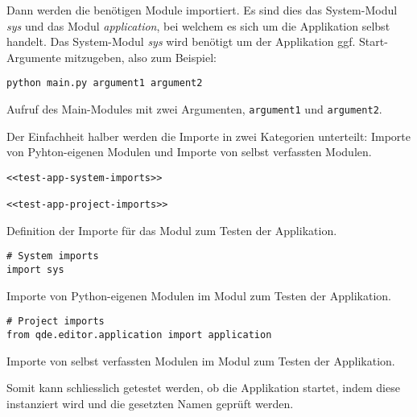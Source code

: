 \documentclass[10pt, openright, notitlepage]{scrreprt}
\begin{document}
Dann werden die benötigen Module importiert. Es sind dies das System-Modul
\emph{sys} und das Modul \emph{application}, bei welchem es sich um die Applikation
selbst handelt. Das System-Modul \emph{sys} wird benötigt um der Applikation ggf.
Start-Argumente mitzugeben, also zum Beispiel:

\begin{listing}[H]
\begin{verbatim}
python main.py argument1 argument2
\end{verbatim}
\caption{\label{orgd1f84d9}
Aufruf des Main-Modules mit zwei Argumenten, \texttt{argument1} und \texttt{argument2}.}
\end{listing}

Der Einfachheit halber werden die Importe in zwei Kategorien unterteilt: Importe
von Pyhton-eigenen Modulen und Importe von selbst verfassten Modulen.

\begin{listing}[H]
\begin{verbatim}
<<test-app-system-imports>>

<<test-app-project-imports>>
\end{verbatim}
\caption{\label{orge011ad2}
Definition der Importe für das Modul zum Testen der Applikation.}
\end{listing}

\begin{listing}[H]
\begin{verbatim}
# System imports
import sys
\end{verbatim}
\caption{\label{org2474af3}
Importe von Python-eigenen Modulen im Modul zum Testen der Applikation.}
\end{listing}

\begin{listing}[H]
\begin{verbatim}
# Project imports
from qde.editor.application import application
\end{verbatim}
\caption{\label{org60a86c1}
Importe von selbst verfassten Modulen im Modul zum Testen der Applikation.}
\end{listing}

Somit kann schliesslich getestet werden, ob die Applikation startet, indem diese
instanziert wird und die gesetzten Namen geprüft werden.
\end{document}
